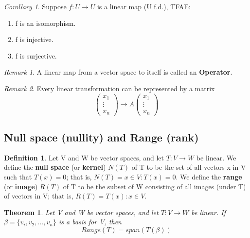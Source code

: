 \documentclass[12pt]{article}
\newtheorem{theorem}{Theorem}[section]
\theoremstyle{definition}
\newtheorem{definition}{Definition}[section]
\theoremstyle{remark}
\newtheorem*{remark}{Remark}
\newtheorem{corollary}{Corollary}[theorem]
\begin{document}
    \begin{corollary}
        Suppose $f: U\rightarrow U$ is a linear map (U f.d.),
        TFAE: 
        \begin{enumerate}
            \item f is an isomorphism. 
            \item f is injective. 
            \item f is surjective. 
        \end{enumerate}
        \begin{remark}
            A linear map from a vector space to itself is called an \textbf{Operator}.
        \end{remark}
        \begin{remark}
            Every linear transformation can be represented by a matrix
            $$ \begin{pmatrix}
                x_1 \\ \vdots \\x_n
            \end{pmatrix} \rightarrow A \begin{pmatrix}
                x_1 \\ \vdots \\x_n
            \end{pmatrix} $$
        \end{remark}
    \end{corollary}
\subsection{Null space (nullity) and Range (rank)}
    \begin{definition}
        Let V and W be vector spaces, and let $T: V \rightarrow W$ be linear. We define the \textbf{null space} 
        (or \textbf{kernel}) $N(T)$ of T to be the set of all vectors x in V such that $T(x) = 0$; that is, $N(T) = { x \in V : T(x) = 0}$.
        We define the \textbf{range} (or \textbf{image}) $R(T)$ of T to be the subset of W consisting of all images (under T) of vectors in V;
         that is, $R(T) = {T(x): x \in V}$.
    \end{definition}
    \begin{theorem}
        Let V and W be vector spaces, and let $T: V\rightarrow W$ be linear. If $\beta = \{v_i,v_2,..., v_n \}$ 
        is a basis for V, then
        $$ Range(T)= span(T(\beta))$$
    \end{theorem}
    
\end{document}
